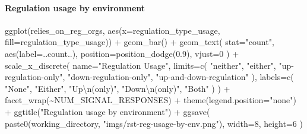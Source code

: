 \documentclass[
]{book}
\newenvironment{Shaded}{\begin{snugshade}}{\end{snugshade}}
\newcommand{\AttributeTok}[1]{\textcolor[rgb]{0.77,0.63,0.00}{#1}}
\newcommand{\DecValTok}[1]{\textcolor[rgb]{0.00,0.00,0.81}{#1}}
\newcommand{\FloatTok}[1]{\textcolor[rgb]{0.00,0.00,0.81}{#1}}
\newcommand{\FunctionTok}[1]{\textcolor[rgb]{0.00,0.00,0.00}{#1}}
\newcommand{\NormalTok}[1]{#1}
\newcommand{\SpecialCharTok}[1]{\textcolor[rgb]{0.00,0.00,0.00}{#1}}
\newcommand{\StringTok}[1]{\textcolor[rgb]{0.31,0.60,0.02}{#1}}
\begin{document}
\hypertarget{regulation-usage-by-environment}{%
\paragraph{Regulation usage by environment}\label{regulation-usage-by-environment}}

\begin{Shaded}
\begin{Highlighting}[]
\FunctionTok{ggplot}\NormalTok{(relies\_on\_reg\_orgs, }\FunctionTok{aes}\NormalTok{(}\AttributeTok{x=}\NormalTok{regulation\_type\_usage, }\AttributeTok{fill=}\NormalTok{regulation\_type\_usage)) }\SpecialCharTok{+}
  \FunctionTok{geom\_bar}\NormalTok{() }\SpecialCharTok{+}
  \FunctionTok{geom\_text}\NormalTok{(}
    \AttributeTok{stat=}\StringTok{"count"}\NormalTok{,}
    \FunctionTok{aes}\NormalTok{(}\AttributeTok{label=}\NormalTok{..count..),}
    \AttributeTok{position=}\FunctionTok{position\_dodge}\NormalTok{(}\FloatTok{0.9}\NormalTok{),}
    \AttributeTok{vjust=}\DecValTok{0}
\NormalTok{  ) }\SpecialCharTok{+}
  \FunctionTok{scale\_x\_discrete}\NormalTok{(}
    \AttributeTok{name=}\StringTok{"Regulation Usage"}\NormalTok{,}
    \AttributeTok{limits=}\FunctionTok{c}\NormalTok{(}
      \StringTok{"neither"}\NormalTok{,}
      \StringTok{"either"}\NormalTok{,}
      \StringTok{"up{-}regulation{-}only"}\NormalTok{,}
      \StringTok{"down{-}regulation{-}only"}\NormalTok{,}
      \StringTok{"up{-}and{-}down{-}regulation"}
\NormalTok{    ),}
    \AttributeTok{labels=}\FunctionTok{c}\NormalTok{(}
      \StringTok{"None"}\NormalTok{,}
      \StringTok{"Either"}\NormalTok{,}
      \StringTok{"Up}\SpecialCharTok{\textbackslash{}n}\StringTok{(only)"}\NormalTok{,}
      \StringTok{"Down}\SpecialCharTok{\textbackslash{}n}\StringTok{(only)"}\NormalTok{,}
      \StringTok{"Both"}
\NormalTok{    )}
\NormalTok{  ) }\SpecialCharTok{+}
  \FunctionTok{facet\_wrap}\NormalTok{(}\SpecialCharTok{\textasciitilde{}}\NormalTok{NUM\_SIGNAL\_RESPONSES) }\SpecialCharTok{+}
  \FunctionTok{theme}\NormalTok{(}\AttributeTok{legend.position=}\StringTok{"none"}\NormalTok{) }\SpecialCharTok{+}
  \FunctionTok{ggtitle}\NormalTok{(}\StringTok{"Regulation usage by environment"}\NormalTok{) }\SpecialCharTok{+}
  \FunctionTok{ggsave}\NormalTok{(}
    \FunctionTok{paste0}\NormalTok{(working\_directory, }\StringTok{"imgs/rst{-}reg{-}usage{-}by{-}env.png"}\NormalTok{),}
    \AttributeTok{width=}\DecValTok{8}\NormalTok{,}
    \AttributeTok{height=}\DecValTok{6}
\NormalTok{  )}
\end{Highlighting}
\end{Shaded}
\end{document}
